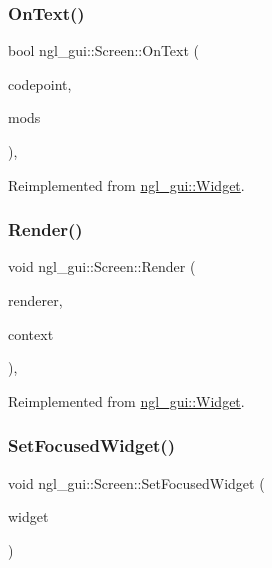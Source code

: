 \subsubsection{\texorpdfstring{On\+Text()}{OnText()}}
{\footnotesize\ttfamily bool ngl\+\_\+gui\+::\+Screen\+::\+On\+Text (\begin{DoxyParamCaption}\item[{unsigned int}]{codepoint,  }\item[{int}]{mods }\end{DoxyParamCaption})\hspace{0.3cm}{\ttfamily [override]}, {\ttfamily [virtual]}}



Reimplemented from \mbox{\hyperlink{classngl__gui_1_1_widget_ab991bcac876f5652190a81beece5f0f1}{ngl\+\_\+gui\+::\+Widget}}.

\mbox{\label{classngl__gui_1_1_screen_ad020aeab5832bc6b4de6e4d6b73534da}} 
\subsubsection{\texorpdfstring{Render()}{Render()}}
{\footnotesize\ttfamily void ngl\+\_\+gui\+::\+Screen\+::\+Render (\begin{DoxyParamCaption}\item[{\mbox{\hyperlink{classngl__gui_1_1_g_u_i_renderer}{G\+U\+I\+Renderer}} \&}]{renderer,  }\item[{\mbox{\hyperlink{classngl__gui_1_1_g_u_i_rendering_context}{G\+U\+I\+Rendering\+Context}} \&}]{context }\end{DoxyParamCaption})\hspace{0.3cm}{\ttfamily [override]}, {\ttfamily [virtual]}}



Reimplemented from \mbox{\hyperlink{classngl__gui_1_1_widget_ac62483b01680572a40125f9208a86392}{ngl\+\_\+gui\+::\+Widget}}.

\mbox{\label{classngl__gui_1_1_screen_afbe7eb1318c16137632a0b2cb29bc704}} 
\subsubsection{\texorpdfstring{Set\+Focused\+Widget()}{SetFocusedWidget()}}
{\footnotesize\ttfamily void ngl\+\_\+gui\+::\+Screen\+::\+Set\+Focused\+Widget (\begin{DoxyParamCaption}\item[{\mbox{\hyperlink{classngl__gui_1_1_widget}{Widget}} $\ast$}]{widget }\end{DoxyParamCaption})}



